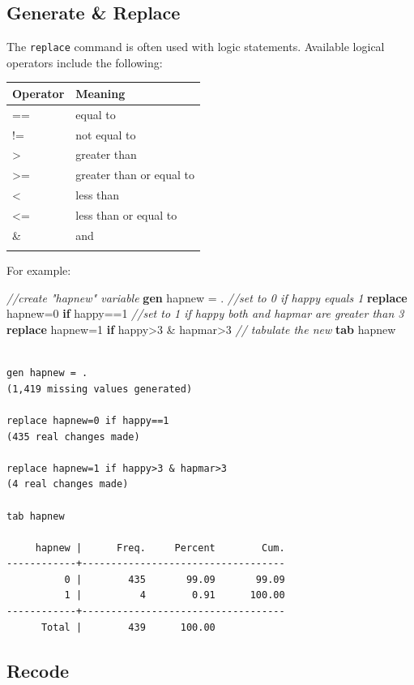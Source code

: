 \documentclass[]{book}
\newenvironment{Shaded}{\begin{snugshade}}{\end{snugshade}}
\newcommand{\CommentTok}[1]{\textcolor[rgb]{0.56,0.35,0.01}{\textit{#1}}}
\newcommand{\KeywordTok}[1]{\textcolor[rgb]{0.13,0.29,0.53}{\textbf{#1}}}
\newcommand{\NormalTok}[1]{#1}
\begin{document}
\hypertarget{generate-replace}{%
\subsection{Generate \& Replace}\label{generate-replace}}

The \texttt{replace} command is often used with logic statements. Available logical operators include the following:

\begin{longtable}[]{@{}ll@{}}
\toprule
Operator & Meaning\tabularnewline
\midrule
\endhead
== & equal to\tabularnewline
!= & not equal to\tabularnewline
\textgreater{} & greater than\tabularnewline
\textgreater= & greater than or equal to\tabularnewline
\textless{} & less than\tabularnewline
\textless= & less than or equal to\tabularnewline
\& & and\tabularnewline
&\tabularnewline
\bottomrule
\end{longtable}

For example:

\begin{Shaded}
\begin{Highlighting}[]
  \CommentTok{//create "hapnew" variable}
  \KeywordTok{gen}\NormalTok{ hapnew = .}
  \CommentTok{//set to 0 if happy equals 1}
  \KeywordTok{replace}\NormalTok{ hapnew=0 }\KeywordTok{if}\NormalTok{ happy==1 }
  \CommentTok{//set to 1 if happy both and hapmar are greater than 3}
  \KeywordTok{replace}\NormalTok{ hapnew=1 }\KeywordTok{if}\NormalTok{ happy>3 & hapmar>3 }
  \CommentTok{// tabulate the new }
  \KeywordTok{tab}\NormalTok{ hapnew}
\end{Highlighting}
\end{Shaded}

\begin{verbatim}

gen hapnew = .
(1,419 missing values generated)

replace hapnew=0 if happy==1 
(435 real changes made)

replace hapnew=1 if happy>3 & hapmar>3 
(4 real changes made)

tab hapnew

     hapnew |      Freq.     Percent        Cum.
------------+-----------------------------------
          0 |        435       99.09       99.09
          1 |          4        0.91      100.00
------------+-----------------------------------
      Total |        439      100.00
\end{verbatim}

\hypertarget{recode}{%
\subsection{Recode}\label{recode}}
\end{document}
